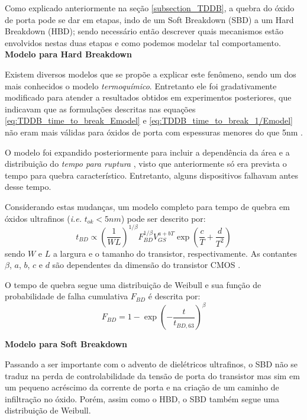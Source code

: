Como explicado anteriormente na seção \ref{subsection_TDDB}, a quebra do óxido de porta pode se dar em etapas, indo de um Soft Breakdown (SBD) a um Hard Breakdown (HBD); sendo necessário então descrever quais mecanismos estão envolvidos nestas duas etapas e como podemos modelar tal comportamento.
\\

\textbf{Modelo para Hard Breakdown}

Existem diversos modelos que se propõe a explicar este fenômeno, sendo um dos mais conhecidos o modelo \textit{termoquímico}. Entretanto ele foi gradativamente modificado para atender a resultados obtidos em experimentos posteriores, que indicavam que as formulações descritas nas equações \ref{eq:TDDB_time_to_break_Emodel} e \ref{eq:TDDB_time_to_break_1/Emodel} não eram mais válidas para óxidos de porta com espessuras menores do que 5nm \cite{Wu2001}.

O modelo foi expandido posteriormente para incluir a dependência da área e a distribuição do \textit{tempo para ruptura} \cite{Wu2005}, visto que anteriormente só era prevista o tempo para quebra característico. Entretanto, alguns dispositivos falhavam antes desse tempo.

Considerando estas mudanças, um modelo completo para tempo de quebra em óxidos ultrafinos (\textit{i.e.} $t_{ok} < 5nm$) pode ser descrito por:
\begin{equation}\label{eq:TDDB_complete_model}
t_{BD}\propto \left(\frac{1}{WL}\right)^{1/ \beta}F_{BD}^{1/\beta}V_{GS}^{a+bT}\exp\left(\frac{c}{T} + \frac{d}{T^2}\right)
\end{equation}
sendo $W$ e $L$ a largura e o tamanho do transistor, respectivamente. As contantes $\beta$, $a$, $b$, $c$ e $d$ são dependentes da dimensão do transistor CMOS \cite{Li2008}.

O tempo de quebra segue uma distribuição de Weibull e sua função de probabilidade de falha cumulativa $F_{BD}$ é descrita por:
\begin{equation}\label{eq:TDDB_probability_function}
F_{BD}=1-\exp \left(-\frac{t}{t_{BD,63}}\right)^\beta
\end{equation}

\textbf{Modelo para Soft Breakdown}

Passando a ser importante com o advento de dielétricos ultrafinos, o SBD não se traduz na perda de controlabilidade da tensão de porta do transistor mas sim em um pequeno acréscimo da corrente de porta e na criação de um caminho de infiltração no óxido. Porém, assim como o HBD, o SBD também segue uma distribuição de Weibull.

